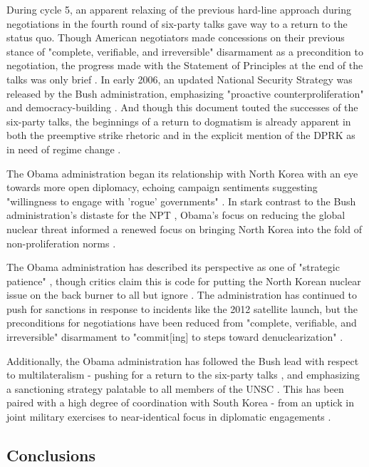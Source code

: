 \documentclass{article}
\begin{document}
During cycle 5, an apparent relaxing of the previous hard-line approach during negotiations in the fourth round of six-party talks gave way to a return to the status quo. Though American negotiators made concessions on their previous stance of "complete, verifiable, and irreversible" disarmament as a precondition to negotiation, the progress made with the Statement of Principles at the end of the talks was only brief \cite{huntley}. In early 2006, an updated National Security Strategy was released by the Bush administration, emphasizing "proactive counterproliferation" and democracy-building \cite{nss06}. And though this document touted the successes of the six-party talks, the beginnings of a return to dogmatism is already apparent in both the preemptive strike rhetoric and in the explicit mention of the DPRK as in need of regime change \cite{nss06}.

The Obama administration began its relationship with North Korea with an eye towards more open diplomacy, echoing campaign sentiments suggesting "willingness to engage with 'rogue' governments" \cite{crs13}. In stark contrast to the Bush administration's distaste for the NPT \cite{huntley}, Obama's focus on reducing the global nuclear threat informed a renewed focus on bringing North Korea into the fold of non-proliferation norms \cite{crs13}.

The Obama administration has described its perspective as one of "strategic patience" \cite{crs13}, though critics claim this is code for putting the North Korean nuclear issue on the back burner to all but ignore \cite{green}. The administration has continued to push for sanctions in response to incidents like the 2012 satellite launch, but the preconditions for negotiations have been reduced from "complete, verifiable, and irreversible" disarmament \cite{huntley} to "commit[ing] to steps toward denuclearization" \cite{crs13}.

Additionally, the Obama administration has followed the Bush lead with respect to multilateralism - pushing for a return to the six-party talks \cite{crs13}, and emphasizing a sanctioning strategy palatable to all members of the UNSC \cite{green}. This has been paired with a high degree of coordination with South Korea - from an uptick in joint military exercises to near-identical focus in diplomatic engagements \cite{crs13}.

\subsection{Conclusions}
\end{document}
